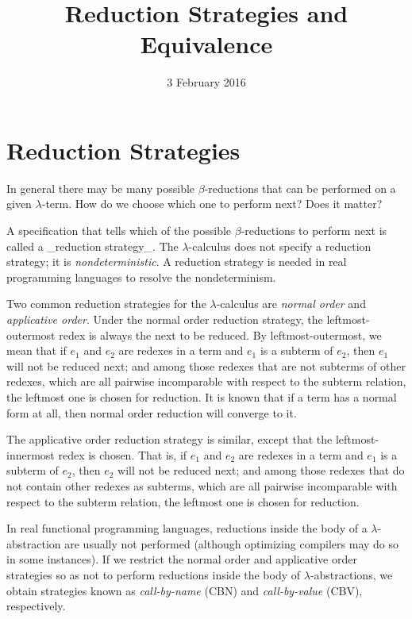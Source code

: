 \title{Reduction Strategies and Equivalence}
\date{3 February 2016}
\maketitle

\section{Reduction Strategies}

In general there may be many possible $\beta$-reductions that can be
performed on a given $\lambda$-term. How do we choose which one to
perform next? Does it matter?

A specification that tells which of the possible $\beta$-reductions to
perform next is called a _reduction strategy_.  The $\lambda$-calculus
does not specify a reduction strategy; it
is \emph{nondeterministic}. A reduction strategy is needed in real
programming languages to resolve the nondeterminism.

Two common reduction strategies for the $\lambda$-calculus
are \emph{normal order} and \emph{applicative order}. Under the normal
order reduction strategy, the leftmost-outermost redex is always the
next to be reduced. By leftmost-outermost, we mean that if $e_1$ and
$e_2$ are redexes in a term and $e_1$ is a subterm of $e_2$, then
$e_1$ will not be reduced next; and among those redexes that are not
subterms of other redexes, which are all pairwise incomparable with
respect to the subterm relation, the leftmost one is chosen for
reduction. It is known that if a term has a normal form at all, then
normal order reduction will converge to it.

The applicative order reduction strategy is similar, except that the
leftmost-innermost redex is chosen. That is, if $e_1$ and $e_2$ are
redexes in a term and $e_1$ is a subterm of $e_2$, then $e_2$ will not
be reduced next; and among those redexes that do not contain other
redexes as subterms, which are all pairwise incomparable with respect
to the subterm relation, the leftmost one is chosen for reduction.

In real functional programming languages, reductions inside the body
of a $\lambda$-abstraction are usually not performed (although
optimizing compilers may do so in some instances). If we restrict the
normal order and applicative order strategies so as not to perform
reductions inside the body of $\lambda$-abstractions, we obtain
strategies known as \emph{call-by-name} (CBN) and \emph{call-by-value}
(CBV), respectively.

